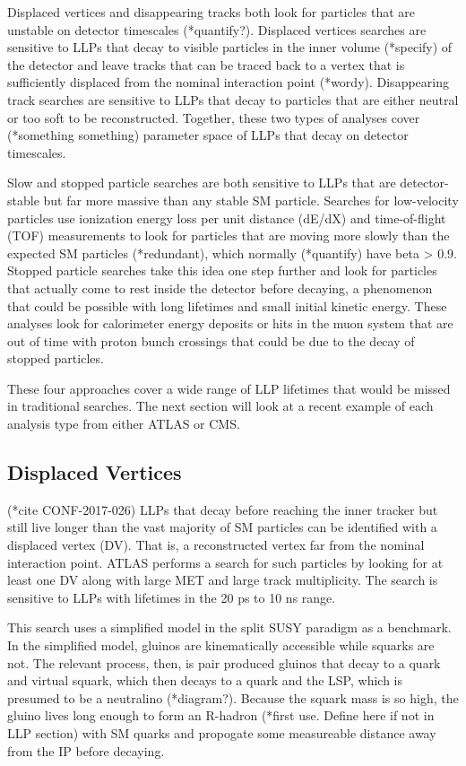 \documentclass[12pt]{article}
\begin{document}
    Displaced vertices and disappearing tracks both look for particles that are unstable on detector timescales (*quantify?). Displaced vertices searches are sensitive to LLPs that decay to visible particles in the inner volume (*specify) of the detector and leave tracks that can be traced back to a vertex that is sufficiently displaced from the nominal interaction point (*wordy). Disappearing track searches are sensitive to LLPs that decay to particles that are either neutral or too soft to be reconstructed. Together, these two types of analyses cover (*something something) parameter space of LLPs that decay on detector timescales.

    Slow and stopped particle searches are both sensitive to LLPs that are detector-stable but far more massive than any stable SM particle. Searches for low-velocity particles use ionization energy loss per unit distance (dE/dX) and time-of-flight (TOF) measurements to look for particles that are moving more slowly than the expected SM particles (*redundant), which normally (*quantify) have beta > 0.9. Stopped particle searches take this idea one step further and look for particles that actually come to rest inside the detector before decaying, a phenomenon that could be possible with long lifetimes and small initial kinetic energy. These analyses look for calorimeter energy deposits or hits in the muon system that are out of time with proton bunch crossings that could be due to the decay of stopped particles.

    These four approaches cover a wide range of LLP lifetimes that would be missed in traditional searches. The next section will look  at a recent example of each analysis type from either ATLAS or CMS.

\subsection{Displaced Vertices}
    (*cite CONF-2017-026)
    LLPs that decay before reaching the inner tracker but still live longer than the vast majority of SM particles can be identified with a displaced vertex (DV). That is, a reconstructed vertex far from the nominal interaction point. ATLAS performs a search for such particles by looking for at least one DV along with large MET and large track multiplicity. The search is sensitive to LLPs with lifetimes in the 20 ps to 10 ns range.

    This search uses a simplified model in the split SUSY paradigm as a benchmark. In the simplified model, gluinos are kinematically accessible while squarks are not. The relevant process, then, is pair produced gluinos that decay to a quark and virtual squark, which then decays to a quark and the LSP, which is presumed to be a neutralino (*diagram?). Because the squark mass is so high, the gluino lives long enough to form an R-hadron (*first use. Define here if not in LLP section) with SM quarks and propogate some measureable distance away from the IP before decaying. 
\end{document}
